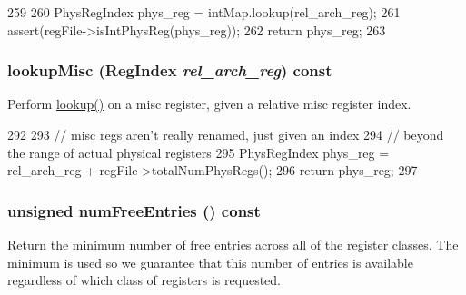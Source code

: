 \begin{DoxyCode}
259     {
260         PhysRegIndex phys_reg = intMap.lookup(rel_arch_reg);
261         assert(regFile->isIntPhysReg(phys_reg));
262         return phys_reg;
263     }
\end{DoxyCode}
\hypertarget{classUnifiedRenameMap_aa15bfaea32a01837167598470949c063}{
\subsubsection[{lookupMisc}]{ lookupMisc ({\bf RegIndex} {\em rel\_\-arch\_\-reg}) const}}
\label{classUnifiedRenameMap_aa15bfaea32a01837167598470949c063}
Perform \hyperlink{classUnifiedRenameMap_a149269d2ce2fbf7e13ec91a5647bf170}{lookup()} on a misc register, given a relative misc register index. 


\begin{DoxyCode}
292     {
293         // misc regs aren't really renamed, just given an index
294         // beyond the range of actual physical registers
295         PhysRegIndex phys_reg = rel_arch_reg + regFile->totalNumPhysRegs();
296         return phys_reg;
297     }
\end{DoxyCode}
\hypertarget{classUnifiedRenameMap_a1fb7464c57712609e9d9ca38aff7fc8e}{
\subsubsection[{numFreeEntries}]{\setlength{\rightskip}{0pt plus 5cm}unsigned numFreeEntries () const}}
\label{classUnifiedRenameMap_a1fb7464c57712609e9d9ca38aff7fc8e}
Return the minimum number of free entries across all of the register classes. The minimum is used so we guarantee that this number of entries is available regardless of which class of registers is requested. 


